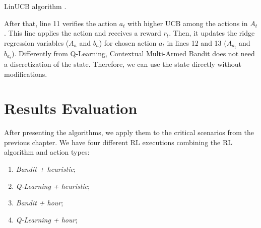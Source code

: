 \IncMargin{1em}
\begin{algorithm}[!htb]
    \footnotesize
    \SetAlgoLined
    \caption{LinUCB algorithm \cite{li2010contextual}.}
    \label{alg:linucb}
\end{algorithm}
\DecMargin{1em}

After that, line 11 verifies the action $a_t$ with higher UCB among the actions in $A_t$. This line applies the action and receives a reward $r_t$. Then, it updates the ridge regression variables ($A_a$ and $b_a$) for chosen action $a_t$ in lines 12 and 13 ($A_{a_{t}}$ and $b_{a_{t}}$). Differently from Q-Learning, Contextual Multi-Armed Bandit does not need a discretization of the state. Therefore, we can use the state directly without modifications.

\section{Results Evaluation}

After presenting the algorithms, we apply them to the critical scenarios from the previous chapter. We have four different RL executions combining the RL algorithm and action types: 

\begin{enumerate}
    \item \emph{Bandit + heuristic};
    \item \emph{Q-Learning + heuristic};
    \item \emph{Bandit + hour};
    \item \emph{Q-Learning + hour};
\end{enumerate}

